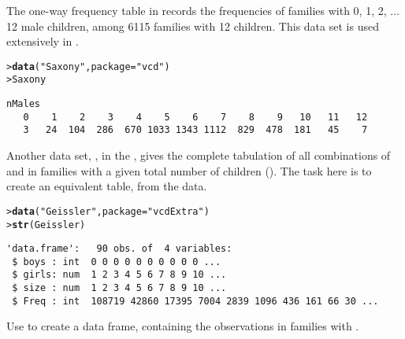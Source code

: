 \documentclass[11pt]{report}\usepackage[]{graphicx}\usepackage[]{color}
\makeatletter
\newcommand{\hlstr}[1]{\textcolor[rgb]{0.192,0.494,0.8}{#1}}%
\newcommand{\hlstd}[1]{\textcolor[rgb]{0.345,0.345,0.345}{#1}}%
\newcommand{\hlkwc}[1]{\textcolor[rgb]{0.333,0.667,0.333}{#1}}%
\newcommand{\hlkwd}[1]{\textcolor[rgb]{0.737,0.353,0.396}{\textbf{#1}}}%
\newenvironment{kframe}{%
 \def\at@end@of@kframe{}%
 \ifinner\ifhmode%
  \def\at@end@of@kframe{\end{minipage}}%
  \begin{minipage}{\columnwidth}%
 \fi\fi%
 \def\FrameCommand##1{\hskip\@totalleftmargin \hskip-\fboxsep
 \colorbox{shadecolor}{##1}\hskip-\fboxsep
     \hskip-\linewidth \hskip-\@totalleftmargin \hskip\columnwidth}%
 \MakeFramed {\advance\hsize-\width
   \@totalleftmargin\z@ \linewidth\hsize
   \@setminipage}}%
 {\par\unskip\endMakeFramed%
 \at@end@of@kframe}
\newenvironment{knitrout}{}{} %
\renewenvironment{knitrout}{\small\renewcommand{\baselinestretch}{.85}}{} %
\makeatother
\begin{document}
\begin{Exercises}
\exercise The one-way frequency table  in  records the frequencies
of families with 0, 1, 2, $\dots$ 12 male children, among 6115 families with 12
children.  This data set is used extensively in .
\begin{knitrout}
\color{fgcolor}\begin{kframe}
\begin{alltt}
\hlstd{> }\hlkwd{data}\hlstd{(}\hlstr{"Saxony"}\hlstd{,} \hlkwc{package} \hlstd{=} \hlstr{"vcd"}\hlstd{)}
\hlstd{> }\hlstd{Saxony}
\end{alltt}
\begin{verbatim}
nMales
   0    1    2    3    4    5    6    7    8    9   10   11   12 
   3   24  104  286  670 1033 1343 1112  829  478  181   45    7 
\end{verbatim}
\end{kframe}
\end{knitrout}
Another data set, , in the , gives the complete
tabulation of all combinations of  and  in families with
a given total number of children ().  The task here is to create an
equivalent table,  from the  data.
\begin{knitrout}
\color{fgcolor}\begin{kframe}
\begin{alltt}
\hlstd{> }\hlkwd{data}\hlstd{(}\hlstr{"Geissler"}\hlstd{,} \hlkwc{package} \hlstd{=} \hlstr{"vcdExtra"}\hlstd{)}
\hlstd{> }\hlkwd{str}\hlstd{(Geissler)}
\end{alltt}
\begin{verbatim}
'data.frame':	90 obs. of  4 variables:
 $ boys : int  0 0 0 0 0 0 0 0 0 0 ...
 $ girls: num  1 2 3 4 5 6 7 8 9 10 ...
 $ size : num  1 2 3 4 5 6 7 8 9 10 ...
 $ Freq : int  108719 42860 17395 7004 2839 1096 436 161 66 30 ...
\end{verbatim}
\end{kframe}
\end{knitrout}
  \begin{enumerate*}
    \item Use  to create a data frame,  containing
    the  observations in families with .
    \begin{ans}
    \end{ans}
    

\end{enumerate*}
\end{Exercises}
\end{document}
